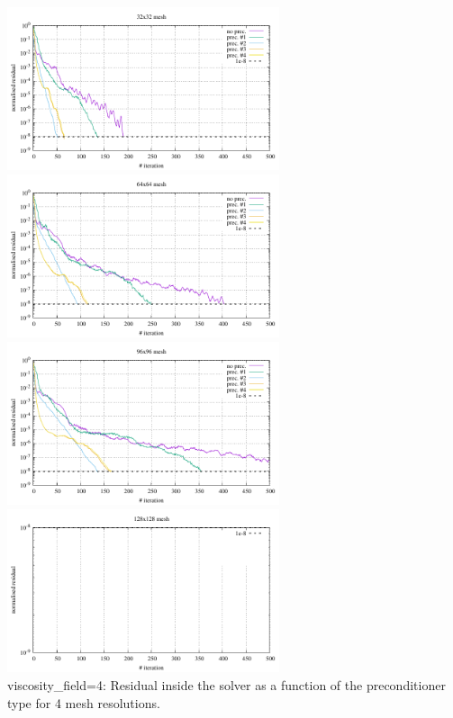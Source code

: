 \begin{center} 
\includegraphics[width=8cm]{python_codes/fieldstone_16/results/visc_field_4/residual_32x32.pdf}
\includegraphics[width=8cm]{python_codes/fieldstone_16/results/visc_field_4/residual_64x64.pdf}\\
\includegraphics[width=8cm]{python_codes/fieldstone_16/results/visc_field_4/residual_96x96.pdf}
\includegraphics[width=8cm]{python_codes/fieldstone_16/results/visc_field_4/residual_128x128.pdf}\\
{\captionfont viscosity\_field=4: Residual inside the solver as a function of the preconditioner type for
4 mesh resolutions.}
\end{center}


